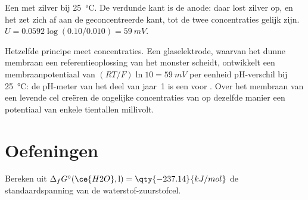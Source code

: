 \begin{omfigure}

{\small Een  met zilver bij \qty{25}{\degreeCelsius}. De verdunde kant is
de anode: daar lost zilver op, en het zet zich af aan de geconcentreerde kant,
tot de twee concentraties gelijk zijn. $U = 0.0592\log(0.10/0.010) =
\qty{59}{mV}$.}
\end{omfigure}

Hetzelfde principe meet concentraties. Een glaselektrode, waarvan het dunne
membraan een referentieoplossing van het monster scheidt, ontwikkelt een
membraanpotentiaal van $(RT/F)\ln 10 = \qty{59}{mV}$ per eenheid pH-verschil bij
\qty{25}{\degreeCelsius}: de pH-meter van het deel van jaar~1 is een 
voor . Over het membraan van een levende cel creëren de ongelijke concentraties
van  op dezelfde manier een potentiaal van enkele tientallen millivolt.

\section{Oefeningen}

\begin{exercise}[$\star$]\label{exo:b2:cell-thermodynamics:1}
Bereken uit $\Delta_f G^\circ(\ce{H2O}, \text{l}) = \qty{-237.14}{kJ/mol}$ de
standaardspanning van de waterstof-zuurstofcel.
\end{exercise}

